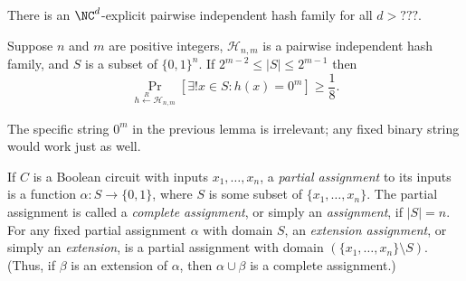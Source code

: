\documentclass{article}
\newcommand{\existsu}{\exists !}
\newcommand{\random}{\overset{R}{\gets}}
\begin{document}
\begin{lemma}\label{lem:hash}
  There is an $\NC^d$-explicit pairwise independent hash family for all $d > ???$.
\end{lemma}

\begin{lemma}\label{lem:vv}
  Suppose $n$ and $m$ are positive integers, $\mathcal{H}_{n, m}$ is a pairwise independent hash family, and $S$ is a subset of $\{0, 1\}^n$.
  If $2^{m - 2} \leq |S| \leq 2^{m - 1}$ then
  \begin{equation*}
    \Pr_{h \random \mathcal{H}_{n, m}}\left[\existsu x \in S \colon h(x) = 0^m \right] \geq \frac{1}{8}.
  \end{equation*}
\end{lemma}

The specific string $0^m$ in the previous lemma is irrelevant; any fixed binary string would work just as well.

\begin{definition}
  If $C$ is a Boolean circuit with inputs $x_1, \dotsc, x_n$, a \emph{partial assignment} to its inputs is a function $\alpha \colon S \to \{0, 1\}$, where $S$ is some subset of $\{x_1, \dotsc, x_n\}$.
  The partial assignment is called a \emph{complete assignment}, or simply an \emph{assignment}, if $|S| = n$.
  For any fixed partial assignment $\alpha$ with domain $S$, an \emph{extension assignment}, or simply an \emph{extension}, is a partial assignment with domain $(\{x_1, \dotsc, x_n\} \setminus S)$.
  (Thus, if $\beta$ is an extension of $\alpha$, then $\alpha \cup \beta$ is a complete assignment.)
\end{definition}
\end{document}
